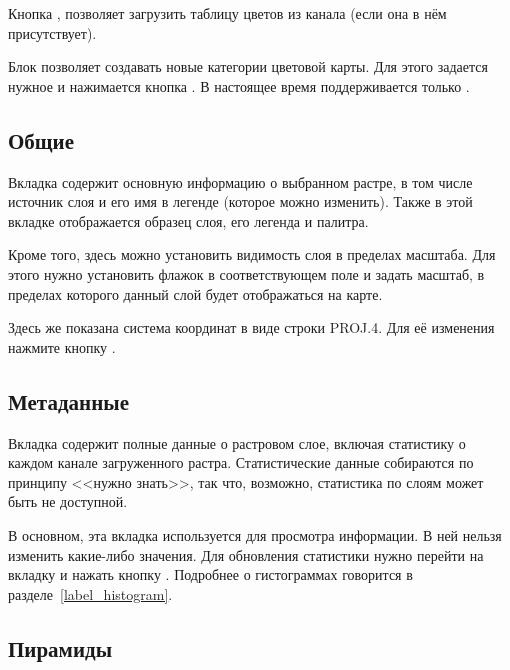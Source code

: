Кнопка ,
позволяет загрузить таблицу цветов из канала (если она в нём присутствует).

Блок  позволяет создавать
новые категории цветовой карты. Для этого задается нужное
 и нажимается кнопка
. В настоящее время поддерживается только
.

\subsection{Общие}\label{label_generaltab}

Вкладка  содержит основную информацию о выбранном растре,
в том числе источник слоя и его имя в легенде (которое можно изменить).
Также в этой вкладке отображается образец слоя, его легенда и палитра.

Кроме того, здесь можно установить видимость слоя в пределах
масштаба. Для этого нужно установить флажок в соответствующем поле и
задать масштаб, в пределах которого данный слой будет отображаться на
карте.

Здесь же показана система координат в виде строки PROJ.4. Для её изменения
нажмите кнопку .

\subsection{Метаданные}\label{label_metatab}

Вкладка  содержит полные данные о растровом слое,
включая статистику о каждом канале загруженного растра. Статистические
данные собираются по принципу <<нужно знать>>, так что, возможно,
статистика по слоям может быть не доступной.

В основном, эта вкладка используется для просмотра информации. В ней
нельзя изменить какие-либо значения. Для обновления статистики нужно
перейти на вкладку  и нажать кнопку .
Подробнее о гистограммах говорится в разделе~\ref{label_histogram}.

\subsection{Пирамиды}\label{raster_pyramids}

